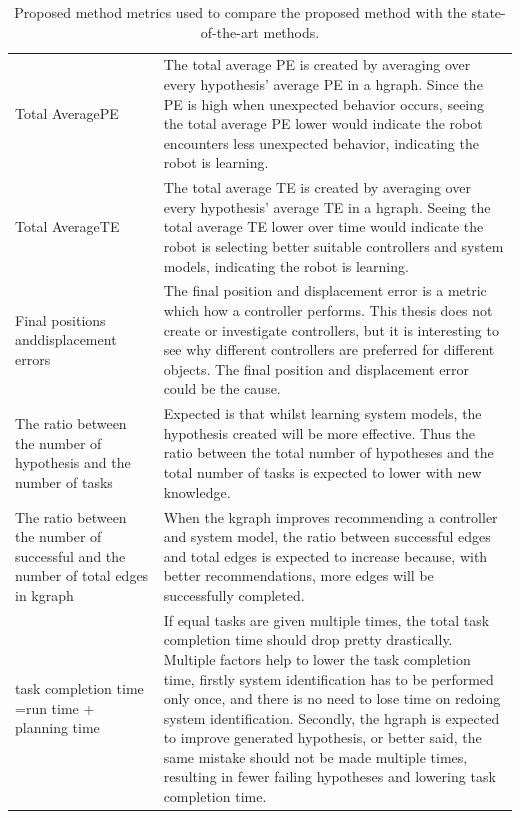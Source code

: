 \noindent
\begin{table}[H]
\centering
\begin{tabular}%
  {>{\raggedright\arraybackslash}p{}%
   >{\raggedright\arraybackslash}p{}}
Total Average\newline \acl{PE} & The total average \ac{PE} is created by averaging over every hypothesis' average \ac{PE} in a \ac{hgraph}. Since the \ac{PE} is high when unexpected behavior occurs, seeing the total average \ac{PE} lower would indicate the robot encounters less unexpected behavior, indicating the robot is learning.\\
Total Average\newline \acl{TE}& The total average \ac{TE} is created by averaging over every hypothesis' average \ac{TE} in a \ac{hgraph}. Seeing the total average \ac{TE} lower over time would indicate the robot is selecting better suitable controllers and system models, indicating the robot is learning.\\
Final positions and\newline displacement errors & The final position and displacement error is a metric which how a controller performs. This thesis does not create or investigate controllers, but it is interesting to see why different controllers are preferred for different objects. The final position and displacement error could be the cause.\\
The ratio between the number of hypothesis and the number of tasks & Expected is that whilst learning system models, the hypothesis created will be more effective. Thus the ratio between the total number of hypotheses and the total number of tasks is expected to lower with new knowledge.\\
The ratio between the number of successful and the number of total edges in \ac{kgraph} & When the \ac{kgraph} improves recommending a controller and system model, the ratio between successful edges and total edges is expected to increase because, with better recommendations, more edges will be successfully completed.\\
task completion time =\newline run time + planning time& If equal tasks are given multiple times, the total task completion time should drop pretty drastically. Multiple factors help to lower the task completion time, firstly system identification has to be performed only once, and there is no need to lose time on redoing system identification. Secondly, the \ac{hgraph} is expected to improve generated hypothesis, or better said, the same mistake should not be made multiple times, resulting in fewer failing hypotheses and lowering task completion time.\\
\end{tabular}
\caption{Proposed method metrics used to compare the proposed method with the state-of-the-art methods.}\label{table:proposed_method_metrics}
\end{table}

